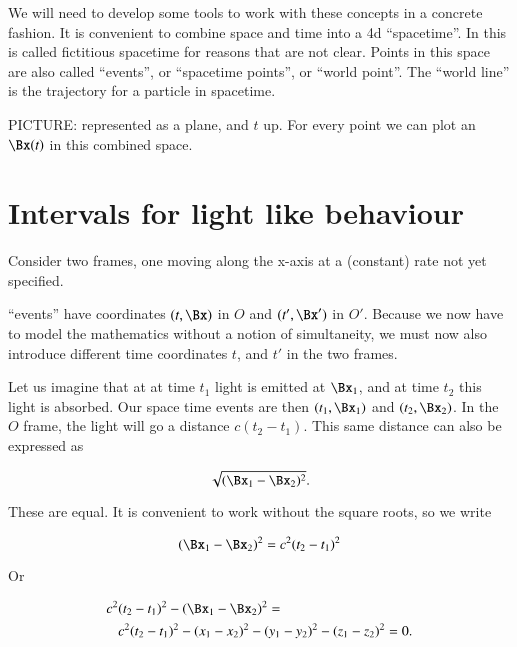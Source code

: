 %
%


We will need to develop some tools to work with these concepts in a concrete fashion.  It is convenient to combine space  and time  into a 4d ``spacetime''.  In \citep{landau1980classical} this is called fictitious spacetime for reasons that are not clear.  Points in this space are also called ``events'', or ``spacetime points'', or ``world point''.  The ``world line'' is the trajectory for a particle in spacetime.

PICTURE:  represented as a plane, and \(t\) up.  For every point we can plot an \(\Bx(t)\) in this combined space.

\section{Intervals for light like behaviour}

Consider two frames, one moving along the x-axis at a (constant) rate not yet specified.

``events'' have coordinates \((t, \Bx)\) in \(O\) and \((t', \Bx')\) in \(O'\).  Because we now have to model the mathematics without a notion of simultaneity, we must now also introduce different time coordinates \(t\), and \(t'\) in the two frames.

Let us imagine that at at time \(t_1\) light is emitted at \(\Bx_1\), and at time \(t_2\) this light is absorbed.  Our space time events are then \((t_1, \Bx_1)\) and \((t_2, \Bx_2)\).  In the \(O\) frame, the light will go a distance \(c(t_2 - t_1)\).  This same distance can also be expressed as

\begin{equation}\label{eqn:relativisticElectrodynamicsL2:10}
\sqrt{ (\Bx_1 - \Bx_2)^2}.
\end{equation}

These are equal.  It is convenient to work without the square roots, so we write

\begin{equation}\label{eqn:relativisticElectrodynamicsL2:20}
(\Bx_1 - \Bx_2)^2 = c^2 (t_2 - t_1)^2
\end{equation}

Or

\begin{equation}\label{eqn:relativisticElectrodynamicsL2:30}
\begin{aligned}
c^2 &(t_2 - t_1)^2 - (\Bx_1 - \Bx_2)^2 = \\
&c^2 (t_2 - t_1)^2
- (x_1 - x_2)^2
- (y_1 - y_2)^2
- (z_1 - z_2)^2 = 0.
\end{aligned}
\end{equation}

